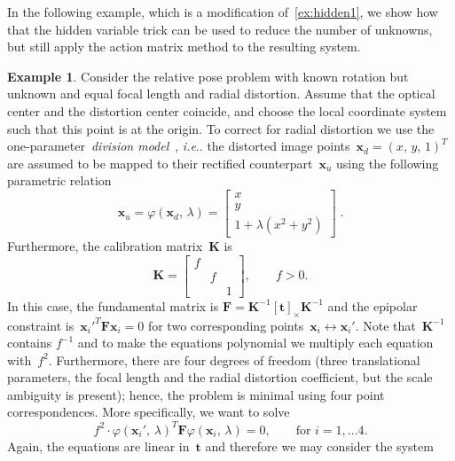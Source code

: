 \documentclass[11pt,a4paper]{article}
\makeatletter
\theoremstyle{definition}
\newtheorem{example}{Example}
\renewcommand{\phi}{\varphi}
\newcommand{\T}{T}
\newcommand{\te}[1]{\text{#1}}
\newcommand{\mat}[1]{\bm{#1}}
\DeclareRobustCommand\ie{\emph{i.e}\@ifnextchar.{}{.\@}}
\makeatother
\begin{document}
In the following example, which is a modification of~\cref{ex:hidden1}, we show how that
the hidden variable trick can be used to reduce the number of unknowns, but still
apply the action matrix method to the resulting system.

\begin{example}
Consider the relative pose problem with known rotation but unknown and equal focal length and radial distortion.
Assume that the optical center and the distortion center coincide, and choose the local
coordinate system such that this point is at the origin. To correct for radial distortion we use
the one-parameter~\emph{division model}~\cite{fitzgibbon2001}, \ie{} the distorted
image points~$\mat{x}_d=(x,\,y,\,1)^\T$ are assumed to be mapped to their rectified counterpart~$\mat{x}_u$
using the following parametric relation
\begin{equation}
    \mat{x}_u = \phi(\mat{x}_d,\,\lambda) =
    \begin{bmatrix}
        x \\
        y \\
        1 + \lambda(x^2+y^2)
    \end{bmatrix}\;.
\end{equation}
Furthermore, the calibration matrix~$\mat{K}$ is
\begin{equation}
    \mat{K} = \begin{bmatrix}
    f\\ & f\\ && 1
    \end{bmatrix}, \qquad f > 0.
\end{equation}
In this case, the fundamental matrix is $\mat{F} = \mat{K}^{-1}[\mat{t}]_\times\mat{K}^{-1}$
and the epipolar constraint is~$\mat{x}_i'^\T\mat{Fx}_i = 0$ for two corresponding
points~$\mat{x}_i\leftrightarrow\mat{x}_i'$. Note that~$\mat{K}^{-1}$ contains $f^{-1}$ and
to make the equations polynomial we multiply each equation with~$f^2$. Furthermore, there
are four degrees of freedom (three translational parameters, the focal length and the radial
distortion coefficient, but the scale ambiguity is present); hence, the problem is minimal using four point correspondences.
More specifically, we want to solve
\begin{equation}
    f^2\cdot \phi(\mat{x}_i',\,\lambda)^\T \mat{F} \phi(\mat{x}_i,\,\lambda) = 0, \qquad \te{for }i=1,\ldots 4.
\end{equation}
Again, the equations are linear in~$\mat{t}$ and therefore we may consider the
system
\begin{equation}

\end{equation}
\end{example}
\end{document}
